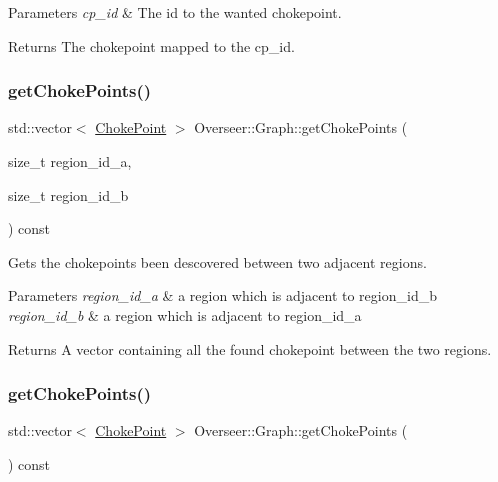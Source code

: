 \begin{DoxyParams}{Parameters}
{\em cp\+\_\+id} & The id to the wanted chokepoint. \\
\hline
\end{DoxyParams}
\begin{DoxyReturn}{Returns}
The chokepoint mapped to the cp\+\_\+id. 
\end{DoxyReturn}
\mbox{\label{classOverseer_1_1Graph_a0d41b814406a8ed2612b7d606670c5cd}} 
\subsubsection{\texorpdfstring{get\+Choke\+Points()}{getChokePoints()}\hspace{0.1cm}{\footnotesize\ttfamily [1/2]}}
{\footnotesize\ttfamily std\+::vector$<$ \hyperlink{classOverseer_1_1ChokePoint}{Choke\+Point} $>$ Overseer\+::\+Graph\+::get\+Choke\+Points (\begin{DoxyParamCaption}\item[{size\+\_\+t}]{region\+\_\+id\+\_\+a,  }\item[{size\+\_\+t}]{region\+\_\+id\+\_\+b }\end{DoxyParamCaption}) const}



Gets the chokepoints been descovered between two adjacent regions. 


\begin{DoxyParams}{Parameters}
{\em region\+\_\+id\+\_\+a} & a region which is adjacent to region\+\_\+id\+\_\+b \\
\hline
{\em region\+\_\+id\+\_\+b} & a region which is adjacent to region\+\_\+id\+\_\+a \\
\hline
\end{DoxyParams}
\begin{DoxyReturn}{Returns}
A vector containing all the found chokepoint between the two regions. 
\end{DoxyReturn}
\mbox{\label{classOverseer_1_1Graph_a5c40f106b55d259b1168a501f9c35ab3}} 
\subsubsection{\texorpdfstring{get\+Choke\+Points()}{getChokePoints()}\hspace{0.1cm}{\footnotesize\ttfamily [2/2]}}
{\footnotesize\ttfamily std\+::vector$<$ \hyperlink{classOverseer_1_1ChokePoint}{Choke\+Point} $>$ Overseer\+::\+Graph\+::get\+Choke\+Points (\begin{DoxyParamCaption}{ }\end{DoxyParamCaption}) const}



